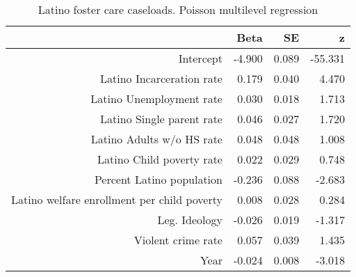 \begin{table}[ht]
\centering
\begin{tabular}{rrrr}
  \hline
 & Beta & SE & z \\ 
  \hline
Intercept & -4.900 & 0.089 & -55.331 \\ 
  Latino Incarceration rate & 0.179 & 0.040 & 4.470 \\ 
  Latino Unemployment rate & 0.030 & 0.018 & 1.713 \\ 
  Latino Single parent rate & 0.046 & 0.027 & 1.720 \\ 
  Latino Adults w/o HS rate & 0.048 & 0.048 & 1.008 \\ 
  Latino Child poverty rate & 0.022 & 0.029 & 0.748 \\ 
  Percent Latino population & -0.236 & 0.088 & -2.683 \\ 
  Latino welfare enrollment per child poverty & 0.008 & 0.028 & 0.284 \\ 
  Leg. Ideology & -0.026 & 0.019 & -1.317 \\ 
  Violent crime rate & 0.057 & 0.039 & 1.435 \\ 
  Year & -0.024 & 0.008 & -3.018 \\ 
   \hline
\end{tabular}
\caption{Latino foster care caseloads. Poisson multilevel regression} 
\label{l.c.tab}
\end{table}
